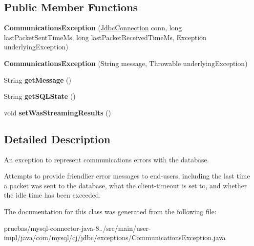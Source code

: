 \subsection*{Public Member Functions}
\begin{DoxyCompactItemize}
\item 
\mbox{\label{classcom_1_1mysql_1_1cj_1_1jdbc_1_1exceptions_1_1_communications_exception_a7f4c2d50e516af22b690b858bb6ce620}} 
{\bfseries Communications\+Exception} (\mbox{\hyperlink{interfacecom_1_1mysql_1_1cj_1_1jdbc_1_1_jdbc_connection}{Jdbc\+Connection}} conn, long last\+Packet\+Sent\+Time\+Ms, long last\+Packet\+Received\+Time\+Ms, Exception underlying\+Exception)
\item 
\mbox{\label{classcom_1_1mysql_1_1cj_1_1jdbc_1_1exceptions_1_1_communications_exception_a2947d467151f9fca74a3af4e29a44cc3}} 
{\bfseries Communications\+Exception} (String message, Throwable underlying\+Exception)
\item 
\mbox{\label{classcom_1_1mysql_1_1cj_1_1jdbc_1_1exceptions_1_1_communications_exception_a76c0204d0e1d7227770114662433a7da}} 
String {\bfseries get\+Message} ()
\item 
\mbox{\label{classcom_1_1mysql_1_1cj_1_1jdbc_1_1exceptions_1_1_communications_exception_a98a2ad5b51b736dc3ec58edae855462d}} 
String {\bfseries get\+S\+Q\+L\+State} ()
\item 
\mbox{\label{classcom_1_1mysql_1_1cj_1_1jdbc_1_1exceptions_1_1_communications_exception_a29388ae45258ad923ba62072c51507ae}} 
void {\bfseries set\+Was\+Streaming\+Results} ()
\end{DoxyCompactItemize}


\subsection{Detailed Description}
An exception to represent communications errors with the database.

Attempts to provide \textquotesingle{}friendlier\textquotesingle{} error messages to end-\/users, including the last time a packet was sent to the database, what the client-\/timeout is set to, and whether the idle time has been exceeded. 

The documentation for this class was generated from the following file\+:\begin{DoxyCompactItemize}
\item 
pruebas/mysql-\/connector-\/java-\/8../src/main/user-\/impl/java/com/mysql/cj/jdbc/exceptions/Communications\+Exception.\+java\end{DoxyCompactItemize}
